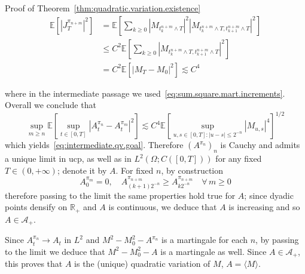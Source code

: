 \documentclass{article}
\newcommand{\textbf}[1]{\text{{\bfseries{#1}}}}
\newenvironment{proof*}[1]{\noindent\textbf{#1\ }}{\hspace*{\fill}$\Box$\medskip}
\newcommand{\1}{\1}
\begin{document}
{\begin{proof*}{Proof of Theorem~\ref{thm:quadratic.variation.existence}}
  \begin{align*}
    \mathbb{E} [| J^{\pi_{n + m}}_T |^2] & =\mathbb{E} \left[ \sum_{k
    \geqslant 0} | M_{t^{n + m}_k \wedge T} |^2 | M_{t^{n + m}_k \wedge T,
    t^{n + m}_{k + 1} \wedge T} |^2 \right]\\
    & \leqslant C^2 \mathbb{E} \left[ \sum_{k \geqslant 0} | M_{t^{n + m}_k
    \wedge T, t^{n + m}_{k + 1} \wedge T} |^2 \right]\\
    & = C^2 \mathbb{E} [| M_T - M_0 |^2] \lesssim C^4
  \end{align*}
  
  where in the intermediate passage we
  used~\eqref{eq:sum.square.mart.increments}. Overall we conclude that
  \[ \sup_{m \geqslant n} \mathbb{E} [\sup_{t \in [0, T]} | A^{\pi_n}_t -
     A^{\pi_m}_t |^2] \lesssim C^4 \mathbb{E} [\sup_{u, s \in [0, T] : | u - s
     | \leqslant 2^{- n}}   | M_{u, s} |^4]^{1 / 2} \]
  which yields~\eqref{eq:intermediate.qv.goal}. Therefore $(A^{\pi_n})_n$ is
  Cauchy and admits a unique limit in ucp, as well as in $L^2 (\Omega ; C ([0,
  T]))$ for any fixed $T \in (0, + \infty)$; denote it by $A$. For fixed $n$,
  by construction
  \[ A^{\pi_m}_0 = 0, \quad A^{\pi_{n + m}}_{(k + 1) 2^{- n}} \geqslant
     A^{\pi_{n + m}}_{k 2^{- n}} \quad \forall \, m \geqslant 0 \]
  therefore passing to the limit the same properties hold true for $A$; since
  dyadic points densify on $\mathbb{R}_+$ and $A$ is continuous, we deduce
  that $A$ is increasing and so $A \in \mathcal{A}_+$.
  
  \textbf{Step 4.} Since $A^{\pi_n}_t \rightarrow A_t$ in $L^2$ and $M^2 -
  M^2_0 - A^{\pi_n}$ is a martingale for each $n$, by passing to the limit we
  deduce that $M^2 - M^2_0 - A$ is a martingale as well. Since $A \in
  \mathcal{A}_+$, this proves that $A$ is the (unique) quadratic variation of
  $M$, $A = \langle M \rangle$.
  

\end{proof*}}
\end{document}
